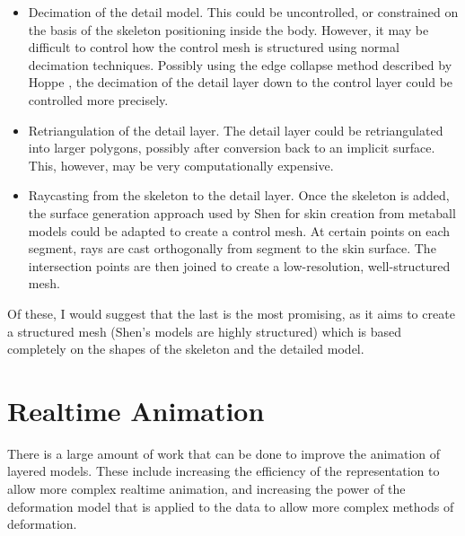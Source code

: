 \documentclass[10pt,oneside,fleqn,a4paper]{book}
\begin{document}
\begin{itemize}
\item Decimation of the detail model. This could be uncontrolled, or constrained on the basis of the skeleton positioning inside the body. However, it may be difficult to control how the control mesh is structured using normal decimation techniques. Possibly using the edge collapse method described by Hoppe \cite{Hoppe93}, the decimation of the detail layer down to the control layer could be controlled more precisely.
\item Retriangulation of the detail layer. The detail layer could be retriangulated into larger polygons, possibly after conversion back to an implicit surface. This, however, may be very computationally expensive.
\item Raycasting from the skeleton to the detail layer. Once the skeleton is added, the surface generation approach used by Shen \cite{Shen95} for skin creation from metaball models could be adapted to create a control mesh. At certain points on each segment, rays are cast orthogonally from segment to the skin surface. The intersection points are then joined to create a low-resolution, well-structured mesh.
\end{itemize}

Of these, I would suggest that the last is the most promising, as it aims to create a structured mesh (Shen's models are highly structured) which is based completely on the shapes of the skeleton and the detailed model.

\section{\label{sec:futureanimation}Realtime Animation}
There is a large amount of work that can be done to improve the animation of layered models. These include increasing the efficiency of the representation to allow more complex realtime animation, and increasing the power of the deformation model that is applied to the data to allow more complex methods of deformation. 
\end{document}
